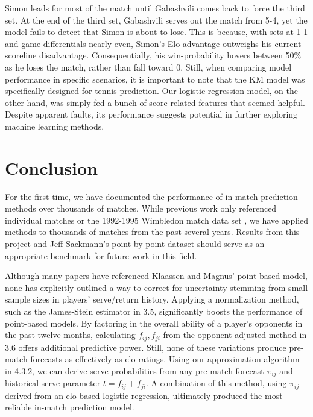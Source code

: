 \documentclass[chapterprefix=false]{report}
\begin{document}
Simon leads for most of the match until Gabashvili comes back to force the third set. At the end of the third set, Gabashvili serves out the match from 5-4, yet the model fails to detect that Simon is about to lose. This is because, with sets at 1-1 and game differentials nearly even, Simon's Elo advantage outweighs his current scoreline disadvantage. Consequentially, his win-probability hovers between 50\% as he loses the match, rather than fall toward 0. Still, when comparing model performance in specific scenarios, it is important to note that the KM model was specifically designed for tennis prediction. Our logistic regression model, on the other hand, was simply fed a bunch of score-related features that seemed helpful. Despite apparent faults, its performance suggests potential in further exploring machine learning methods.



\chapter{Conclusion}

For the first time, we have documented the performance of in-match prediction methods over thousands of matches. While previous work only referenced individual matches or the 1992-1995 Wimbledon match data set \cite{KlaassenandMagnus2003}, we have applied methods to thousands of matches from the past several years. Results from this project and Jeff Sackmann's point-by-point dataset should serve as an appropriate benchmark for future work in this field.


Although many papers have referenced Klaassen and Magnus' point-based model, none has explicitly outlined a way to correct for uncertainty stemming from small sample sizes in players' serve/return history. Applying a normalization method, such as the James-Stein estimator in 3.5, significantly boosts the performance of point-based models. By factoring in the overall ability of a player's opponents in the past twelve months, calculating $f_{ij},f_{ji}$ from the opponent-adjusted method in 3.6 offers additional predictive power. Still, none of these variations produce pre-match forecasts as effectively as elo ratings. Using our approximation algorithm in 4.3.2, we can derive serve probabilities from any pre-match forecast $\pi_{ij}$ and historical serve parameter $t = f_{ij} + f_{ji}$. A combination of this method, using $\pi_{ij}$ derived from an elo-based logistic regression, ultimately produced the most reliable in-match prediction model.
\end{document}
